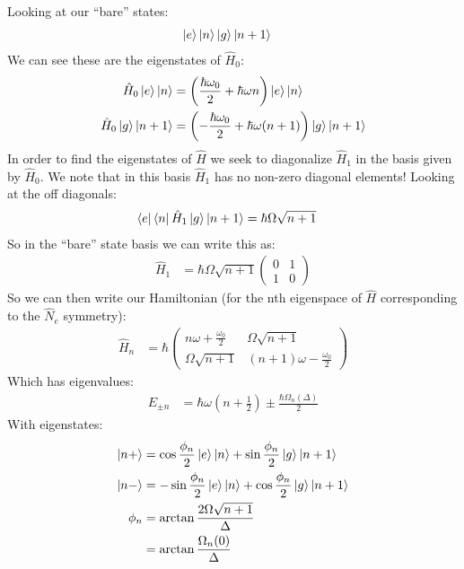 Looking at our ``bare'' states:
\begin{align*}
	\ket{e}\ket{n} & \ket{g}\ket{n+1}
\end{align*}
We can see these are the eigenstates of $\hat{H}_0$:
\begin{align*}
	\hat{H}_0 \ket{e}\ket{n} &= \left(\frac{\hbar\omega_0}{2} + \hbar\omega n\right) \ket{e}\ket{n} \\
	\hat{H}_0 \ket{g}\ket{n +1} &= \left(-\frac{\hbar\omega_0}{2} + \hbar\omega (n+1)\right) \ket{g}\ket{n+1} \\
\end{align*}
In order to find the eigenstates of $\hat{H}$ we seek to diagonalize $\hat{H}_1$ in the basis given by $\hat{H}_0$. We note that in this basis $\hat{H}_1$ has no non-zero diagonal elements! Looking at the off diagonals:
\begin{align*}
	\bra{e}\bra{n} \hat{H}_1\ket{g}\ket{n+1} &= \hbar\Omega\sqrt{n+1}
\end{align*}
So in the ``bare'' state basis we can write this as:
\begin{align*}
	\hat{H}_1 &= \hbar\Omega\sqrt{n+1}\begin{pmatrix}
		0 & 1\\
		1 & 0
		     \end{pmatrix}
\end{align*}
So we can then write our Hamiltonian (for the nth eigenspace of $\hat{H}$ corresponding to the $\hat{N}_e$ symmetry):
\begin{align*}
	\hat{H}_n &= \hbar \begin{pmatrix}
		n\omega + \frac{\omega_0}{2} & \Omega\sqrt{n+1} \\
		\Omega\sqrt{n+1} & (n+1)\omega - \frac{\omega_0}{2}
			 \end{pmatrix}
\end{align*}
Which has eigenvalues:
\begin{align*}
	E_{\pm n} &= \hbar\omega\left(n+\frac{1}{2}\right) \pm \frac{\hbar\Omega_n(\Delta)}{2}
\end{align*}
With eigenstates:
\begin{align*}
	\ket{n+} &= \cos\frac{\phi_n}{2} \ket{e}\ket{n} + \sin\frac{\phi_n}{2} \ket{g}\ket{n+1} \\
	\ket{n-} &= -\sin\frac{\phi_n}{2} \ket{e}\ket{n} + \cos\frac{\phi_n}{2} \ket{g}\ket{n+1} \\
	\phi_n &= \arctan\frac{2\Omega\sqrt{n+1}}{\Delta} \\
	&= \arctan\frac{\Omega_n(0)}{\Delta}
\end{align*}
